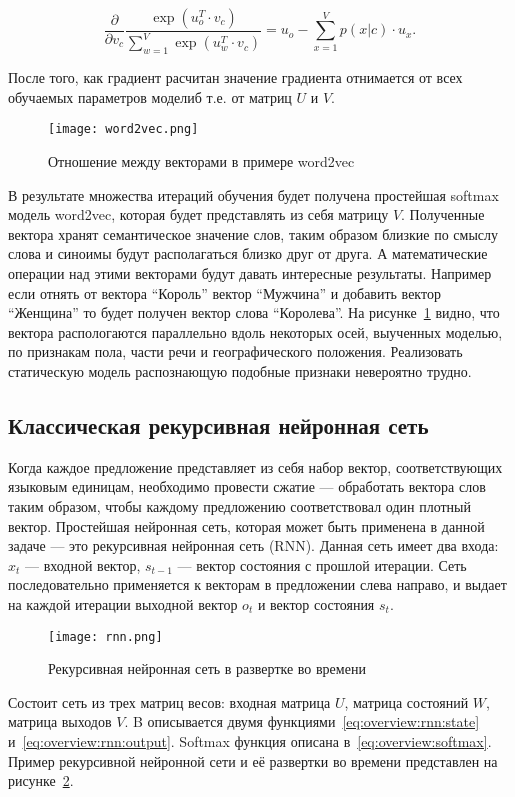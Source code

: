\begin{equation}
  \frac{\partial }{\partial v_c}\frac{\exp({u_{o}^T}\cdot{v_{c}})}{\sum_{w=1}^{V}\exp({u_w^T}\cdot{v_{c}})} = u_o - \sum_{x=1}^{V}p(x|c)\cdot{u_x}.
\end{equation}

После того, как градиент расчитан значение градиента отнимается от всех обучаемых параметров моделиб т.е. от матриц $U$ и $V$.

\begin{figure}[h]
\centering
  \texttt{[image: word2vec.png]}
  \caption{Отношение между векторами в примере word2vec}\label{fig:overview:word2vec}
\end{figure}

В результате множества итераций обучения будет получена простейшая softmax модель word2vec, которая будет представлять из себя матрицу $V$. Полученные вектора хранят семантическое значение слов, таким образом близкие по смыслу слова и синоимы будут располагаться близко друг от друга. А математические операции над этими векторами будут давать интересные результаты. Например если отнять от вектора ``Король'' вектор ``Мужчина'' и добавить вектор ``Женщина'' то будет получен вектор слова ``Королева''. На рисунке~\ref{fig:overview:word2vec} видно, что вектора распологаются параллельно вдоль некоторых осей, выученных моделью, по признакам пола, части речи и географического положения. Реализовать статическую модель распознающую подобные признаки невероятно трудно.

\subsection{Классическая рекурсивная нейронная сеть}\label{subsec:overview:rnn}
Когда каждое предложение представляет из себя набор вектор, соответствующих языковым единицам, необходимо провести сжатие --- обработать вектора слов таким образом, чтобы каждому предложению соответствовал один плотный вектор. Простейшая нейронная сеть, которая может быть применена в данной задаче --- это рекурсивная нейронная сеть (RNN). Данная сеть имеет два входа: $x_{t}$ --- входной вектор, $s_{t-1}$ --- вектор состояния с прошлой итерации. Сеть последовательно применяется к векторам в предложении слева направо, и выдает на каждой итерации выходной вектор $o_{t}$ и вектор состояния $s_t$.

\begin{figure}[h]
\centering
  \texttt{[image: rnn.png]}
  \caption{Рекурсивная нейронная сеть в развертке во времени}\label{fig:overview:rnn}
\end{figure}
Состоит сеть из трех матриц весов: входная матрица $U$, матрица состояний $W$, матрица выходов $V$. B описывается двумя функциями~\ref{eq:overview:rnn:state} и~\ref{eq:overview:rnn:output}. Softmax функция описана в~\ref{eq:overview:softmax}. Пример рекурсивной нейронной сети и её развертки во времени представлен на рисунке~\ref{fig:overview:rnn}.

